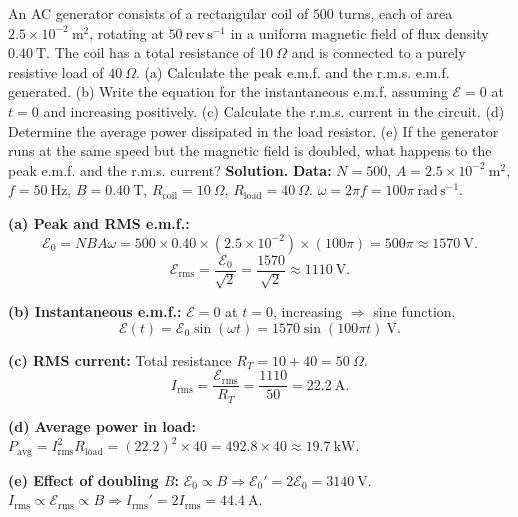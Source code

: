 \documentclass[11pt]{article}
\begin{document}
\begin{exoresolu}
An AC generator consists of a rectangular coil of $500$ turns, each of area $2.5 \times 10^{-2}\ \mathrm{m^2}$, rotating at $50\ \mathrm{rev\,s^{-1}}$ in a uniform magnetic field of flux density $0.40\ \mathrm{T}$. The coil has a total resistance of $10\ \Omega$ and is connected to a purely resistive load of $40\ \Omega$. (a) Calculate the peak e.m.f. and the r.m.s. e.m.f. generated. (b) Write the equation for the instantaneous e.m.f. assuming $\mathcal{E}=0$ at $t=0$ and increasing positively. (c) Calculate the r.m.s. current in the circuit. (d) Determine the average power dissipated in the load resistor. (e) If the generator runs at the same speed but the magnetic field is doubled, what happens to the peak e.m.f. and the r.m.s. current?
\tcblower
\textbf{Solution.}
\textbf{Data:} $N=500$, $A=2.5\times 10^{-2}\ \mathrm{m^2}$, $f=50\ \mathrm{Hz}$, $B=0.40\ \mathrm{T}$, $R_{\text{coil}}=10\ \Omega$, $R_{\text{load}}=40\ \Omega$.
$\omega = 2\pi f = 100\pi\ \mathrm{rad\,s^{-1}}$.

\textbf{(a) Peak and RMS e.m.f.:}
\[
\mathcal{E}_0 = NBA\omega = 500 \times 0.40 \times (2.5\times 10^{-2}) \times (100\pi) = 500\pi \approx \boxed{1570\ \mathrm{V}}.
\]
\[
\mathcal{E}_{\text{rms}} = \frac{\mathcal{E}_0}{\sqrt{2}} = \frac{1570}{\sqrt{2}} \approx \boxed{1110\ \mathrm{V}}.
\]

\textbf{(b) Instantaneous e.m.f.:} $\mathcal{E}=0$ at $t=0$, increasing $\Rightarrow$ sine function.
\[
\mathcal{E}(t) = \mathcal{E}_0 \sin(\omega t) = \boxed{1570 \sin(100\pi t)\ \mathrm{V}}.
\]

\textbf{(c) RMS current:} Total resistance $R_T = 10 + 40 = 50\ \Omega$.
\[
I_{\text{rms}} = \frac{\mathcal{E}_{\text{rms}}}{R_T} = \frac{1110}{50} = \boxed{22.2\ \mathrm{A}}.
\]

\textbf{(d) Average power in load:} $P_{\text{avg}} = I_{\text{rms}}^2 R_{\text{load}} = (22.2)^2 \times 40 = 492.8 \times 40 \approx \boxed{19.7\ \mathrm{kW}}$.

\textbf{(e) Effect of doubling $B$:} $\mathcal{E}_0 \propto B \Rightarrow \mathcal{E}_0' = 2\mathcal{E}_0 = \boxed{3140\ \mathrm{V}}$.
$I_{\text{rms}} \propto \mathcal{E}_{\text{rms}} \propto B \Rightarrow I_{\text{rms}}' = 2I_{\text{rms}} = \boxed{44.4\ \mathrm{A}}$.
\end{exoresolu}
\end{document}
